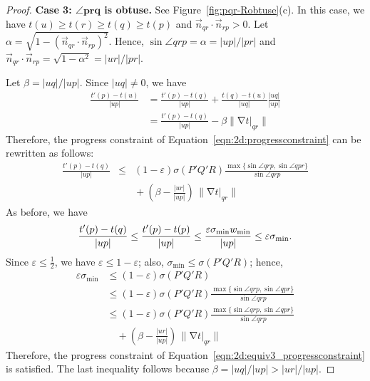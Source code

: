 \documentclass[twocolumn]{article}
\def\minW{\ensuremath{w_{\text{min}}}}
\def\S{\ensuremath{\sigma}}
\def\minS{\ensuremath{\S_{\text{min}}}}
\def\e{\ensuremath{\varepsilon}}
\def\fp{\ensuremath{P}}
\def\fq{\ensuremath{Q}}
\def\fr{\ensuremath{R}}
\DeclareMathOperator{\grad}{\ensuremath{\nabla}}
\def\abs#1{\ensuremath{\mathopen| #1 \mathclose|}}
\def\norm#1{\ensuremath{\mathopen\| #1 \mathclose\|}}
\def\rest#1#2{\ensuremath{\left. #1 \right|_{#2}}}
\def\half{\ensuremath{\frac{1}{2}}}
\begin{document}
\begin{proof}
\noindent\textbf{Case 3: $\mathbf{\angle{prq}}$ is obtuse.}
See Figure~\ref{fig:pqr-Robtuse}(c).  In this case, we have $t(u) \ge
t(r) \ge t(q) \ge t(p)$ and $\vec{n}_{qr} \cdot \vec{n}_{rp} > 0$.
Let $\alpha = \sqrt{1 - (\vec{n}_{qr} \cdot \vec{n}_{rp})^2}$.  Hence,
$\sin \angle{qrp} = \alpha = \abs{up}/\abs{pr}$ and $\vec{n}_{qr}
\cdot \vec{n}_{rp} = \sqrt{1 - \alpha^2} = \abs{ur}/\abs{pr}$.

Let $\beta = \abs{uq}/\abs{up}$.  Since $\abs{uq} \ne 0$, we have
\begin{align*}
  \frac{t'(p) - t(u)}{\abs{up}}
&= 
  \frac{t'(p) - t(q)}{\abs{up}} 
+ 
  \frac{t(q) - t(u)}{\abs{uq}} \frac{\abs{uq}}{\abs{up}}\\
&= 
  \frac{t'(p) - t(q)}{\abs{up}} 
- 
  \beta \norm{\grad \rest{t}{qr}}
\end{align*}
Therefore, the progress constraint of
Equation~\ref{eqn:2d:progressconstraint} can be rewritten as follows:
\begin{equation}
\begin{array}{rcl}
  \frac{t'(p) - t(q)}{\abs{up}}
&\le&
  (1-\e) \S(\fp'\fq'\fr) 
  \frac{\max\{\sin \angle{qrp}, \sin \angle{qpr}\}}{\sin \angle{qrp}}\\[2ex]
&&
  {}+{} \left( \beta - \frac{\abs{ur}}{\abs{up}} \right)
        \, \norm{\grad \rest{t}{qr}}
\end{array}
\label{eqn:2d:equiv3_progressconstraint}
\end{equation}
As before, we have
\[
\frac{t'(p) - t(q)}{\abs{up}}
\le 
  \frac{t'(p) - t(p)}{\abs{up}}\\
\le
  \frac{\e \minS \minW}{\abs{up}}\\
\le
  \e \minS.
\]
Since $\e \le \half$, we have $\e \le 1-\e$; also, $\minS \le
\S(\fp'\fq'\fr)$; hence,
\begin{align*}
\e \minS
&\le
  (1-\e) \S(\fp'\fq'\fr)\\
&\le
  (1-\e) \S(\fp'\fq'\fr) 
  \frac{\max\{\sin \angle{qrp}, \sin \angle{qpr}\}}{\sin \angle{qrp}}\\
&\le
  (1-\e) \S(\fp'\fq'\fr) 
  \frac{\max\{\sin \angle{qrp}, \sin \angle{qpr}\}}{\sin \angle{qrp}}\\
&\quad 
  {}+{} \left( \beta - \frac{\abs{ur}}{\abs{up}} \right)
        \, \norm{\grad \rest{t}{qr}}
\end{align*}
Therefore, the progress constraint of
Equation~\ref{eqn:2d:equiv3_progressconstraint} is satisfied.  The
last inequality follows because $\beta = \abs{uq}/\abs{up} >
\abs{ur}/\abs{up}$.
\end{proof}
\end{document}
